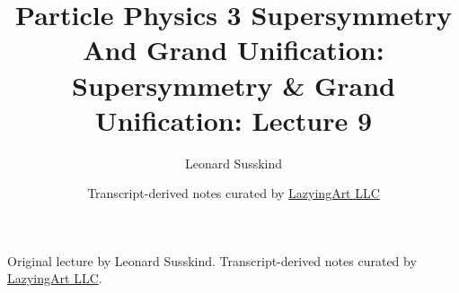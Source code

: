 \documentclass[11pt,oneside]{book}
\begin{document}
\frontmatter
\title{Particle Physics 3 Supersymmetry And Grand Unification: Supersymmetry \& Grand Unification: Lecture 9}
\author{Leonard Susskind}
\date{Transcript-derived notes curated by \href{https://lazying.art}{LazyingArt LLC}}
\maketitle
\begin{center}
\small Original lecture by Leonard Susskind. Transcript-derived notes curated by \href{https://lazying.art}{LazyingArt LLC}.
\end{center}
\clearpage
\mainmatter

\end{document}
